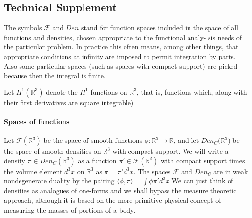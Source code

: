 \subsection{Technical Supplement}
\begin{remark}
 The symbols $\mathcal{F}$ and $Den$ stand for function spaces included in the space
of all functions and densities, chosen appropriate to the functional analy-
sis needs of the particular problem. In practice this often means, among
other things, that appropriate conditions at infinity are imposed to permit
integration by parts. 
Also some particular spaces (such as spaces with compact support) are picked because then the integral is finite.

\end{remark}

\begin{remark}
Let $H^1(\mathbb{R}^3)$ denote the $H^1$ functions on $\mathbb{R}^3$, that is, functions which, along with their 
first derivatives are square integrable)
\end{remark}
\paragraph{Spaces of functions}
 Let $\mathcal{F}(\mathbb{R}^3)$ be the space of smooth functions $\phi:\mathbb{R}^3 \rightarrow \mathbb{R}$,
 and let $Den_{C}(\mathbb{R}^3$) be the space of smooth densities on $\mathbb{R}^3$ with compact support. 
 We will write a density $\pi \in Den_C(\mathbb{R}^3)$ as a function $\pi ' \in \mathcal{F}(\mathbb{R}^3)$ with 
 compact support times the volume element $d^3 x$ on $\mathbb{R}^3$ as $\pi = \pi ' d^3 x$. The spaces $\mathcal{F}$
 and $Den_C$ are in weak nondegenerate duality by the pairing $\langle \phi, \pi \rangle = \int \phi \pi ' d^3 x$
    We can just think of densities as analogues of one-forms and we shall bypass the measure theoretic approach, although it is based on the more
primitive physical concept of measuring the masses of portions of a body.

